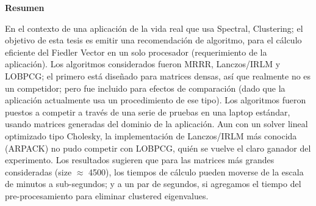 \thispagestyle{plain}
\begin{center}

  \vspace{0.4cm}


  \vspace{0.9cm}
  \textbf{Resumen}
\end{center}

    En el contexto de una aplicación de la vida real que usa Spectral, 
    Clustering; el objetivo de esta tesis es emitir una recomendación
    de algoritmo, para el cálculo eficiente del Fiedler Vector en un
    solo procesador (requerimiento de la aplicación). Los algoritmos
    considerados fueron MRRR, Lanczos/IRLM y LOBPCG; el primero está
    diseñado para matrices densas, así que realmente no es un competidor;
    pero fue incluido para efectos de comparación (dado que la aplicación
    actualmente usa un procedimiento de ese tipo). Los algoritmos fueron
    puestos a competir a través de una serie de pruebas en una
    laptop estándar, usando matrices generadas del dominio de la aplicación. 
    Aun con un solver lineal optimizado tipo Cholesky, la implementación
    de Lanczos/IRLM más conocida (ARPACK) no pudo competir con LOBPCG,
    quién se vuelve el claro  
    ganador del experimento. Los resultados sugieren que para las matrices más
    grandes consideradas (size $\approx$ 4500), los tiempos de cálculo
    pueden moverse  
    de la escala de minutos a sub-segundos; y a un par de segundos, si
    agregamos el tiempo del pre-procesamiento para eliminar 
    clustered eigenvalues.  
